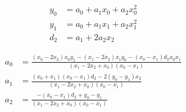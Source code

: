 \begin{align}
  y_0 & = a_0+a_1 x_0+a_2 x_0^{2}  \\
   y_1 & = a_0+a_1 x_1+a_2 x_1^{2}  \\
   d_2 & = a_1+2 a_2 x_2  
\end{align}

 
\begin{align}
  a_0 & = \frac
{ \left( x_0 - 2 x_2 \right)  x_0 y_1 -  \left( x_1 - 2 x_2 \right)  x_1 y_0 -  \left( x_0 -  x_1 \right)  d_2 x_0 x_1}
{ \left( x_1 - 2 x_2+x_0 \right)   \left( x_0 - x_1  \right) } \\
   a_1 & = \frac
{ \left( x_0+x_1 \right)   \left( x_0 - x_1 \right)  d_2 - 2   \left( y_0 - y_1 \right)  x_2}
{ \left( x_1 - 2 x_2+x_0 \right)   \left( x_0 - x_1  \right) } \\
   a_2 & = \frac
{ -  \left( x_0 - x_1 \right)  d_2+y_0 - y_1}
{  \left( x_1 - 2 x_2+x_0 \right)   \left( x_0 - x_1 \right) } 
\end{align}
